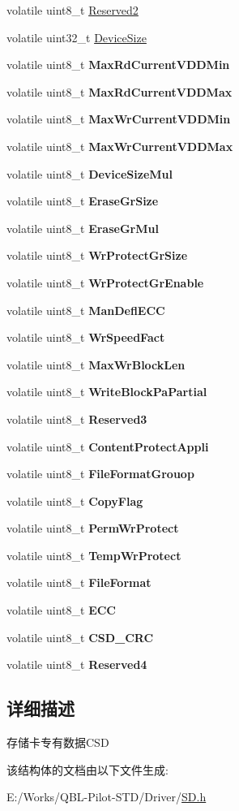 \begin{DoxyCompactItemize}
volatile uint8\+\_\+t \hyperlink{group__sd__card_gae550128917d915a10d07cc6bab428d4a}{Reserved2}
\item 
volatile uint32\+\_\+t \hyperlink{group__sd__card_ga3ef41bf634f8340f737de91de78e33f8}{Device\+Size}
\item 
volatile uint8\+\_\+t {\bfseries Max\+Rd\+Current\+V\+D\+D\+Min}
\item 
volatile uint8\+\_\+t {\bfseries Max\+Rd\+Current\+V\+D\+D\+Max}
\item 
volatile uint8\+\_\+t {\bfseries Max\+Wr\+Current\+V\+D\+D\+Min}
\item 
volatile uint8\+\_\+t {\bfseries Max\+Wr\+Current\+V\+D\+D\+Max}
\item 
volatile uint8\+\_\+t {\bfseries Device\+Size\+Mul}
\item 
volatile uint8\+\_\+t {\bfseries Erase\+Gr\+Size}
\item 
volatile uint8\+\_\+t {\bfseries Erase\+Gr\+Mul}
\item 
volatile uint8\+\_\+t {\bfseries Wr\+Protect\+Gr\+Size}
\item 
volatile uint8\+\_\+t {\bfseries Wr\+Protect\+Gr\+Enable}
\item 
volatile uint8\+\_\+t {\bfseries Man\+Defl\+E\+CC}
\item 
volatile uint8\+\_\+t {\bfseries Wr\+Speed\+Fact}
\item 
volatile uint8\+\_\+t {\bfseries Max\+Wr\+Block\+Len}
\item 
volatile uint8\+\_\+t {\bfseries Write\+Block\+Pa\+Partial}
\item 
volatile uint8\+\_\+t {\bfseries Reserved3}
\item 
volatile uint8\+\_\+t {\bfseries Content\+Protect\+Appli}
\item 
volatile uint8\+\_\+t {\bfseries File\+Format\+Grouop}
\item 
volatile uint8\+\_\+t {\bfseries Copy\+Flag}
\item 
volatile uint8\+\_\+t {\bfseries Perm\+Wr\+Protect}
\item 
volatile uint8\+\_\+t {\bfseries Temp\+Wr\+Protect}
\item 
volatile uint8\+\_\+t {\bfseries File\+Format}
\item 
volatile uint8\+\_\+t {\bfseries E\+CC}
\item 
volatile uint8\+\_\+t {\bfseries C\+S\+D\+\_\+\+C\+RC}
\item 
volatile uint8\+\_\+t {\bfseries Reserved4}
\end{DoxyCompactItemize}


\subsection{详细描述}
存储卡专有数据\+C\+SD 

该结构体的文档由以下文件生成\+:\begin{DoxyCompactItemize}
\item 
E\+:/\+Works/\+Q\+B\+L-\/\+Pilot-\/\+S\+T\+D/\+Driver/\hyperlink{_s_d_8h}{S\+D.\+h}\end{DoxyCompactItemize}
